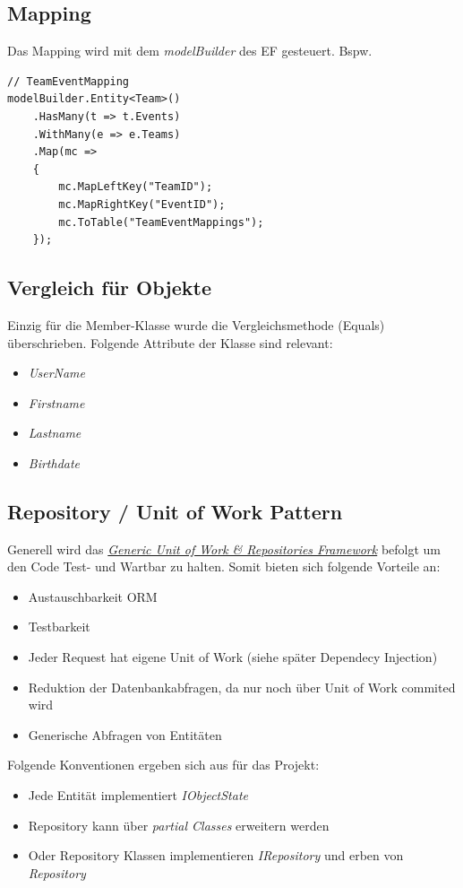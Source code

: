 	\subsection{Mapping}
	Das Mapping wird mit dem \textit{modelBuilder} des EF gesteuert. Bspw.
	\begin{lstlisting}[language=CSharp, caption=Mapping in VoluntaryoContext.cs, label=lst:mappingcontextcs, firstnumber=1]
// TeamEventMapping
modelBuilder.Entity<Team>()
    .HasMany(t => t.Events)
    .WithMany(e => e.Teams)
    .Map(mc =>
    {
        mc.MapLeftKey("TeamID");
        mc.MapRightKey("EventID");
        mc.ToTable("TeamEventMappings");
    });
    \end{lstlisting}

	\subsection{Vergleich für Objekte}
	Einzig für die Member-Klasse wurde die Vergleichsmethode (Equals) überschrieben. Folgende Attribute der Klasse sind relevant:
	\\\begin{itemize}
		\item \textit{UserName}
		\item \textit{Firstname}
		\item \textit{Lastname}
		\item \textit{Birthdate}
	\end{itemize}

	\subsection{Repository / Unit of Work Pattern}
	Generell wird das \href{https://genericunitofworkandrepositories.codeplex.com/}{\textit{Generic Unit of Work \& Repositories Framework}} befolgt um den Code Test- und Wartbar zu halten. Somit bieten sich folgende Vorteile an:
	\\\begin{itemize}	
		\item Austauschbarkeit ORM
		\item Testbarkeit
		\item Jeder Request hat eigene Unit of Work (siehe später Dependecy Injection)
		\item Reduktion der Datenbankabfragen, da nur noch über Unit of Work commited wird
		\item Generische Abfragen von Entitäten
	\end{itemize}
	Folgende Konventionen ergeben sich aus für das Projekt:
	\\\begin{itemize}
		\item Jede Entität implementiert \textit{IObjectState}
		\item Repository kann über \textit{partial Classes} erweitern werden
		\item Oder Repository Klassen implementieren \textit{IRepository} und erben von \textit{Repository}
	\end{itemize}


